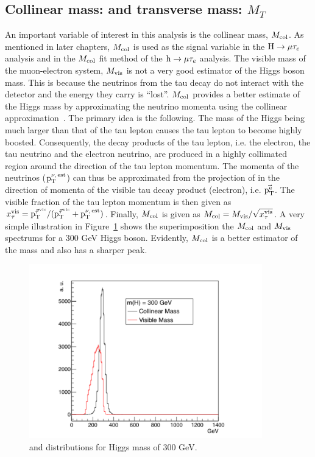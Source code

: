 \subsection{Collinear mass: \mcol and transverse mass: $M_{T}$}
\label{col_mass}
An important variable of interest in this analysis is the collinear mass, $M_{\text{col}}$. As mentioned in later chapters, $M_{\text{col}}$ is used as the signal variable in the $\text{H} \to \mu \tau_{e}$ analysis and in the $M_{\text{col}}$ fit method of the $\text{h} \to \mu \tau_{e}$ analysis. The visible mass of the muon-electron system, $M_{\text{vis}}$ is not a very good estimator of the Higgs boson mass. This is because the neutrinos from the tau decay do not interact with the detector and the energy they carry is ``lost''. $M_{\text{col}}$ provides a better estimate of the Higgs mass by approximating the neutrino momenta using the collinear approximation~\cite{Ellis:1987xu}. The primary idea is the following. The mass of the Higgs being much larger than that of the tau lepton causes the tau lepton to become highly boosted. Consequently, the decay products of the tau lepton, i.e. the electron, the tau neutrino and the electron neutrino, are produced in a highly collimated region around the direction of the tau lepton momentum. The momenta of the neutrinos ($\text{p}_\text{T}^{\nu,\,\text{est}}$) can thus be approximated from the projection of \ptvecmiss in the direction of momenta of the visible tau decay product (electron), i.e. $\vec{\text{p}_\text{T}^{\text{e}}}$. The visible fraction of the tau lepton momentum is then given as $x_{\tau}^\text{vis}={\text{p}_\text{T}^{\vec{\tau}^{\text{vis}}}}/{(\text{p}_\text{T}^{\vec{\tau}^\text{vis}}+\text{p}_\text{T}^{\nu,\,\text{est}})}$. Finally, $M_{\text{col}}$ is given as $M_{\text{col}}= M_{\text{vis}} / \sqrt{\smash[b]{x_{\tau}^\text{vis}}}$. A very simple illustration in Figure~\ref{fig:mcol_v_mvis} shows the superimposition  the $M_{\text{col}}$ and $M_{\text{vis}}$ spectrums for a 300 GeV Higgs boson. Evidently, $M_{\text{col}}$ is a better estimator of the mass and also has a sharper peak.

\begin{figure}[!htpb]\centering
 \includegraphics[width=0.9\textwidth]{plots_and_figures/chapter4/mcol_v_mvis.pdf}
\caption{\mcol and \mvis distributions for Higgs mass of 300 GeV.}
 \label{fig:mcol_v_mvis}
\end{figure}


